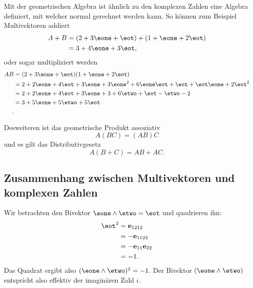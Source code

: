 Mit der geometrischen Algebra ist ähnlich zu den komplexen Zahlen eine Algebra definiert,
mit welcher normal gerechnet werden kann. So können zum Beispiel Multivektoren addiert
\begin{equation}
\begin{aligned}
A + B &= (2 + 3 \eone + \eot) + (1 + \eone + 2 \eot) \\
&= 3 + 4 \eone + 3 \eot,
\end{aligned}
\end{equation}
oder sogar multipliziert werden
\begin{equation}
\begin{aligned}
A  B &= (2 + 3 \eone + \eot) (1 + \eone + 2 \eot) \\
&= 2 + 2 \eone + 4 \eot + 3 \eone + 3 \eone^2 + 6 \eone \eot + \eot + \eot \eone + 2 \eot^2 \\
&= 2 + 2 \eone + 4 \eot + 3 \eone + 3 + 6 \etwo + \eot - \etwo - 2 \\
&= 3 + 5 \eone + 5 \etwo + 5 \eot \\.
\end{aligned}
\end{equation}

Desweiteren ist das geometrische Produkt assoziativ
\begin{equation}
A (B C) = (A B) C
\end{equation}
und es gilt das Distributivgesetz
\begin{equation}
  A (B + C) = AB + AC.
\end{equation}


\subsection{Zusammenhang zwischen Multivektoren und komplexen Zahlen}
Wir betrachten den Bivektor $\eone \wedge \etwo = \eot$ und quadrieren ihn:
\begin{equation}
  \begin{aligned}
    \eot^2 &= \mathbf{e}_{1212} \\
    &= -\mathbf{e}_{1122} \\
    &= -\mathbf{e}_{11} \mathbf{e}_{22} \\
    &= -1.
  \end{aligned}
\end{equation}
\newcommand\equalhat{\mathrel{\stackon[1.5pt]{=}{\stretchto{%
    \scalerel*[\widthof{=}]{\wedge}{\rule{1ex}{3ex}}}{0.5ex}}}}
Das Quadrat ergibt also $(\eone \wedge \etwo)^2 = -1$. Der Bivektor
$(\eone \wedge \etwo)$ entspricht also effektiv der imaginären Zahl $i$.


